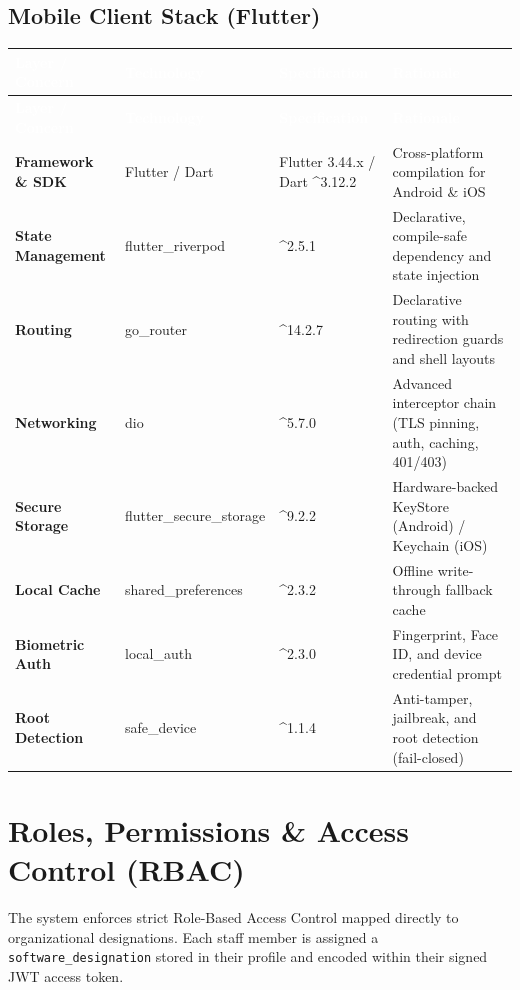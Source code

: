 \documentclass[11pt,a4paper]{article}
\newcommand{\theadstyle}[1]{\textcolor{white}{\bfseries #1}}
\begin{document}
\subsection{Mobile Client Stack (Flutter)}
\begin{longtable}{>{\bfseries}L{2.9cm} L{2.6cm} L{3.0cm} L{4.3cm}}
\theadstyle{Layer / Concern} & \theadstyle{Technology} & \theadstyle{Specification} & \theadstyle{Rationale} \\
\endfirsthead
{}
\theadstyle{Layer / Concern} & \theadstyle{Technology} & \theadstyle{Specification} & \theadstyle{Rationale} \\
\endhead
Framework \& SDK & Flutter / Dart & Flutter 3.44.x / Dart \^{}3.12.2 & Cross-platform compilation for Android \& iOS \\
State Management & flutter\_riverpod & \^{}2.5.1 & Declarative, compile-safe dependency and state injection \\
Routing & go\_router & \^{}14.2.7 & Declarative routing with redirection guards and shell layouts \\
Networking & dio & \^{}5.7.0 & Advanced interceptor chain (TLS pinning, auth, caching, 401/403) \\
Secure Storage & flutter\_secure\_storage & \^{}9.2.2 & Hardware-backed KeyStore (Android) / Keychain (iOS) \\
Local Cache & shared\_preferences & \^{}2.3.2 & Offline write-through fallback cache \\
Biometric Auth & local\_auth & \^{}2.3.0 & Fingerprint, Face ID, and device credential prompt \\
Root Detection & safe\_device & \^{}1.1.4 & Anti-tamper, jailbreak, and root detection (fail-closed) \\
\end{longtable}

\section{Roles, Permissions \& Access Control (RBAC)}

The system enforces strict Role-Based Access Control mapped directly to organizational designations. Each staff member is assigned a \texttt{software\_designation} stored in their profile and encoded within their signed JWT access token.
\end{document}
